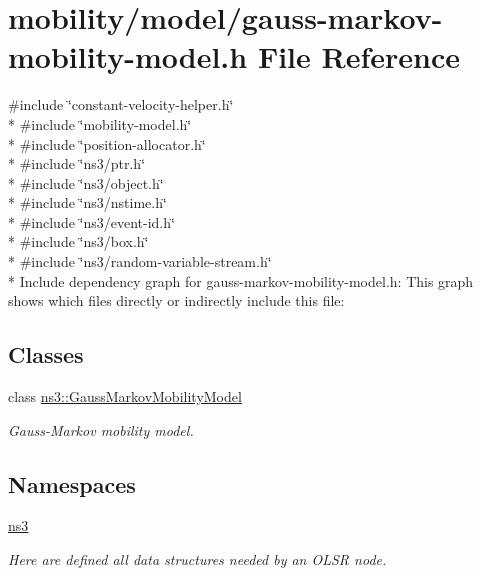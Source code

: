 \hypertarget{gauss-markov-mobility-model_8h}{}\section{mobility/model/gauss-\/markov-\/mobility-\/model.h File Reference}
\label{gauss-markov-mobility-model_8h}
{\ttfamily \#include \char`\"{}constant-\/velocity-\/helper.\+h\char`\"{}}\\*
{\ttfamily \#include \char`\"{}mobility-\/model.\+h\char`\"{}}\\*
{\ttfamily \#include \char`\"{}position-\/allocator.\+h\char`\"{}}\\*
{\ttfamily \#include \char`\"{}ns3/ptr.\+h\char`\"{}}\\*
{\ttfamily \#include \char`\"{}ns3/object.\+h\char`\"{}}\\*
{\ttfamily \#include \char`\"{}ns3/nstime.\+h\char`\"{}}\\*
{\ttfamily \#include \char`\"{}ns3/event-\/id.\+h\char`\"{}}\\*
{\ttfamily \#include \char`\"{}ns3/box.\+h\char`\"{}}\\*
{\ttfamily \#include \char`\"{}ns3/random-\/variable-\/stream.\+h\char`\"{}}\\*
Include dependency graph for gauss-\/markov-\/mobility-\/model.h\+:
This graph shows which files directly or indirectly include this file\+:
\subsection*{Classes}
\begin{DoxyCompactItemize}
\item 
class \hyperlink{classns3_1_1GaussMarkovMobilityModel}{ns3\+::\+Gauss\+Markov\+Mobility\+Model}
\begin{DoxyCompactList}\small\item\em Gauss-\/\+Markov mobility model. \end{DoxyCompactList}\end{DoxyCompactItemize}
\subsection*{Namespaces}
\begin{DoxyCompactItemize}
\item 
 \hyperlink{namespacens3}{ns3}
\begin{DoxyCompactList}\small\item\em Here are defined all data structures needed by an O\+L\+SR node. \end{DoxyCompactList}\end{DoxyCompactItemize}
